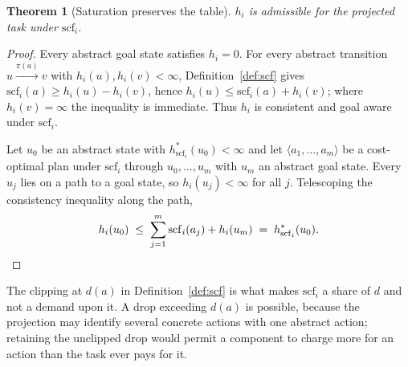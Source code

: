 \documentclass[10pt,twocolumn,a4paper]{article}
\theoremstyle{plain}
\newtheorem{theorem}{Theorem}
\theoremstyle{definition}
\theoremstyle{remark}
\newcommand{\hstar}{h^{*}}
\newcommand{\scf}{\mathrm{scf}}
\newcommand{\proj}{\pi}
\begin{document}
\begin{theorem}[Saturation preserves the table]
\label{thm:saturation}
$h_i$ is admissible for the projected task under $\scf_i$.
\end{theorem}

\begin{proof}
Every abstract goal state satisfies $h_i = 0$. For every abstract transition
$u \xrightarrow{\proj(a)} v$ with $h_i(u), h_i(v) < \infty$,
Definition~\ref{def:scf} gives $\scf_i(a) \ge h_i(u) - h_i(v)$, hence
$h_i(u) \le \scf_i(a) + h_i(v)$; where $h_i(v) = \infty$ the inequality is
immediate. Thus $h_i$ is consistent and goal aware under $\scf_i$.

Let $u_0$ be an abstract state with $\hstar_{\scf_i}(u_0) < \infty$ and let
$\langle a_1, \dots, a_m \rangle$ be a cost-optimal plan under $\scf_i$ through
$u_0, \dots, u_m$ with $u_m$ an abstract goal state. Every $u_j$ lies on a path
to a goal state, so $h_i(u_j) < \infty$ for all $j$. Telescoping the
consistency inequality along the path,
\[
  h_i(u_0) \;\le\; \sum_{j=1}^{m} \scf_i(a_j) + h_i(u_m)
           \;=\; \hstar_{\scf_i}(u_0). \qedhere
\]
\end{proof}

The clipping at $d(a)$ in Definition~\ref{def:scf} is what makes $\scf_i$ a
share of $d$ and not a demand upon it. A drop exceeding $d(a)$ is possible,
because the projection may identify several concrete actions with one abstract
action; retaining the unclipped drop would permit a component to charge more
for an action than the task ever pays for it.
\end{document}
